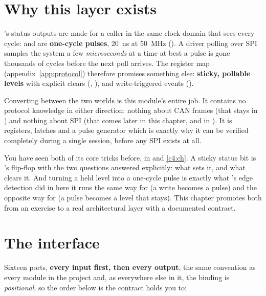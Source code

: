 
\section{Why this layer exists}
\label{c18:sec:why}

's status outputs are made for a caller in the same clock domain that sees every
cycle:  and  are \textbf{one-cycle pulses}, 20~ns at 50~MHz
(). A driver polling over SPI samples the system a few \emph{microseconds} at a time
at best \textemdash{} a pulse is gone thousands of cycles before the next poll arrives. The register
map (appendix~\ref{app:protocol}) therefore promises something else: \textbf{sticky, pollable levels}
with explicit clears (, ), and write-triggered events
().

Converting between the two worlds is this module's entire job. It contains no protocol knowledge in
either direction: nothing about CAN frames (that stays in ) and nothing about
SPI (that comes later in this chapter, and in ). It is registers, latches and a pulse
generator \textemdash{} which is exactly why it can be verified completely during a single session,
before any SPI exists at all.

You have seen both of its core tricks before, in  and \ref{c4:ch}. A sticky status bit
is 's flip-flop with the two questions answered explicitly: what sets it, and what
clears it. And turning a held level into a one-cycle pulse is exactly what 's edge
detection did in  \textemdash{} here it runs the same way for  (a write
becomes a pulse) and the opposite way for  (a pulse becomes a level that stays). This
chapter promotes both from an exercise to a real architectural layer with a documented contract.

\section{The interface}
\label{c18:sec:iface}

Sixteen ports, \textbf{every input first, then every output}, the same convention as every module in
the project \textemdash{} and, as everywhere else in it, the binding is \emph{positional}, so the
order below is the contract  holds you to:

